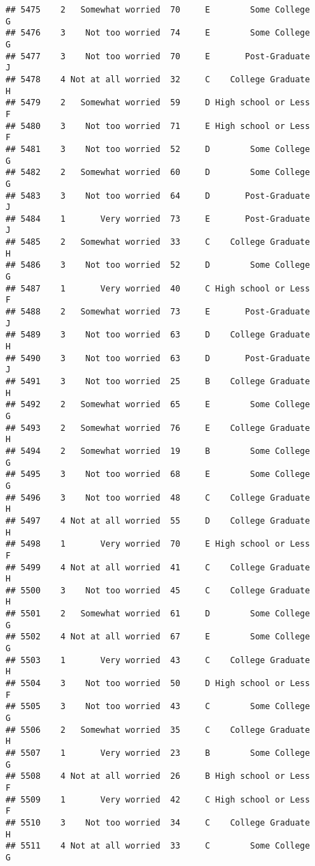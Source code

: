 \documentclass[
]{article}
\begin{document}
\begin{verbatim}
## 5475    2   Somewhat worried  70     E        Some College         G
## 5476    3    Not too worried  74     E        Some College         G
## 5477    3    Not too worried  70     E       Post-Graduate         J
## 5478    4 Not at all worried  32     C    College Graduate         H
## 5479    2   Somewhat worried  59     D High school or Less         F
## 5480    3    Not too worried  71     E High school or Less         F
## 5481    3    Not too worried  52     D        Some College         G
## 5482    2   Somewhat worried  60     D        Some College         G
## 5483    3    Not too worried  64     D       Post-Graduate         J
## 5484    1       Very worried  73     E       Post-Graduate         J
## 5485    2   Somewhat worried  33     C    College Graduate         H
## 5486    3    Not too worried  52     D        Some College         G
## 5487    1       Very worried  40     C High school or Less         F
## 5488    2   Somewhat worried  73     E       Post-Graduate         J
## 5489    3    Not too worried  63     D    College Graduate         H
## 5490    3    Not too worried  63     D       Post-Graduate         J
## 5491    3    Not too worried  25     B    College Graduate         H
## 5492    2   Somewhat worried  65     E        Some College         G
## 5493    2   Somewhat worried  76     E    College Graduate         H
## 5494    2   Somewhat worried  19     B        Some College         G
## 5495    3    Not too worried  68     E        Some College         G
## 5496    3    Not too worried  48     C    College Graduate         H
## 5497    4 Not at all worried  55     D    College Graduate         H
## 5498    1       Very worried  70     E High school or Less         F
## 5499    4 Not at all worried  41     C    College Graduate         H
## 5500    3    Not too worried  45     C    College Graduate         H
## 5501    2   Somewhat worried  61     D        Some College         G
## 5502    4 Not at all worried  67     E        Some College         G
## 5503    1       Very worried  43     C    College Graduate         H
## 5504    3    Not too worried  50     D High school or Less         F
## 5505    3    Not too worried  43     C        Some College         G
## 5506    2   Somewhat worried  35     C    College Graduate         H
## 5507    1       Very worried  23     B        Some College         G
## 5508    4 Not at all worried  26     B High school or Less         F
## 5509    1       Very worried  42     C High school or Less         F
## 5510    3    Not too worried  34     C    College Graduate         H
## 5511    4 Not at all worried  33     C        Some College         G

\end{verbatim}
\end{document}
